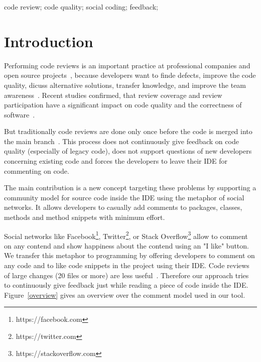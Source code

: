 \documentclass[10pt, conference]{IEEEtran}
\begin{document}
\begin{IEEEkeywords}
code review; code quality; social coding; feedback;

\end{IEEEkeywords}


%
\IEEEpeerreviewmaketitle

\section{Introduction}
Performing code reviews is an important practice at professional companies and open source projects~\cite{balachandran2013PeerCodeReviews, bird2015CodeReviewPlatform, rigby2013PeerCodeReviews, czerwonka2015codereviews}, because developers want to finde defects, improve the code quality, dicuss alternative solutions, transfer knowledge, and improve the team awareness~\cite{rigby2013PeerCodeReviews, bacchelli2013expectations}.
%
Recent studies confirmed, that review coverage and review participation have a significant impact on code quality and the correctness of software~\cite{mcintosh2014impact, thongtanunam2015CodeReviews, shimagaki2016CRInSony}. 
%

%
But traditionally code reviews are done only once before the code is merged into the main branch~\cite{rigby2013PeerCodeReviews}. 
%
This process does not continuously give feedback on code quality (especially of legacy code), does not support questions of new developers concerning existing code and forces the developers to leave their IDE for commenting on code.
%

%
The main contribution is a new concept targeting these problems by supporting a community model for source code inside the IDE using the metaphor of social networks.
%
It allows developers to casually add comments to packages, classes, methods and method snippets with minimum effort.
%

%
Social networks like Facebook\footnote{https://facebook.com}, Twitter\footnote{https://twitter.com}, or Stack Overflow\footnote{https://stackoverflow.com} allow to comment on any contend and show happiness about the contend using an "I like" button.
% 
We transfer this metaphor to programming by offering developers to comment on any code and to like code snippets in the project using their IDE.  
%
Code reviews of large changes (20 files or more) are less useful~\cite{czerwonka2015codereviews}.
%
Therefore our approach tries to continuously give feedback just while reading a piece of code inside the IDE. 
%
Figure~\ref{overview} gives an overview over the comment model used in our tool.
\end{document}
